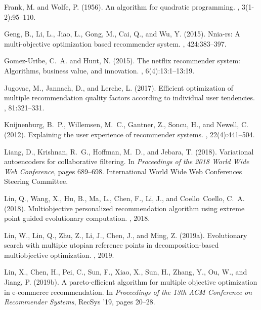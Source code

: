 \documentclass[letterpaper]{article}
\begin{document}
\begin{thebibliography}{}
Frank, M. and Wolfe, P. (1956).
\newblock An algorithm for quadratic programming.
, 3(1-2):95--110.

Geng, B., Li, L., Jiao, L., Gong, M., Cai, Q., and Wu, Y. (2015).
\newblock Nnia-rs: A multi-objective optimization based recommender system.
,
  424:383--397.

Gomez-Uribe, C.~A. and Hunt, N. (2015).
\newblock The netflix recommender system: Algorithms, business value, and
  innovation.
, 6(4):13:1--13:19.

Jugovac, M., Jannach, D., and Lerche, L. (2017).
\newblock Efficient optimization of multiple recommendation quality factors
  according to individual user tendencies.
, 81:321--331.

Knijnenburg, B.~P., Willemsen, M.~C., Gantner, Z., Soncu, H., and Newell, C.
  (2012).
\newblock Explaining the user experience of recommender systems.
, 22(4):441--504.

Liang, D., Krishnan, R.~G., Hoffman, M.~D., and Jebara, T. (2018).
\newblock Variational autoencoders for collaborative filtering.
\newblock In {\em Proceedings of the 2018 World Wide Web Conference}, pages
  689--698. International World Wide Web Conferences Steering Committee.

Lin, Q., Wang, X., Hu, B., Ma, L., Chen, F., Li, J., and Coello~Coello, C.~A.
  (2018).
\newblock Multiobjective personalized recommendation algorithm using extreme
  point guided evolutionary computation.
, 2018.

Lin, W., Lin, Q., Zhu, Z., Li, J., Chen, J., and Ming, Z. (2019a).
\newblock Evolutionary search with multiple utopian reference points in
  decomposition-based multiobjective optimization.
, 2019.

Lin, X., Chen, H., Pei, C., Sun, F., Xiao, X., Sun, H., Zhang, Y., Ou, W., and
  Jiang, P. (2019b).
\newblock A pareto-efficient algorithm for multiple objective optimization in
  e-commerce recommendation.
\newblock In {\em Proceedings of the 13th ACM Conference on Recommender
  Systems}, RecSys '19, pages 20--28.


\end{thebibliography}
\end{document}
